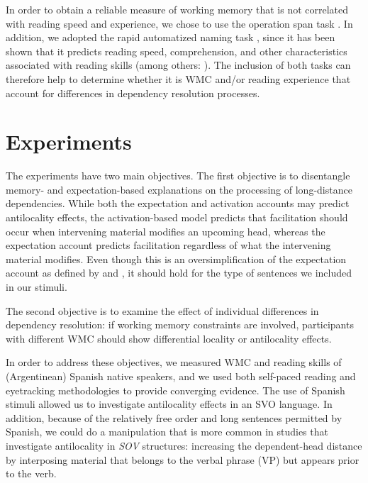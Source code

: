 \documentclass{frontiersSCNS}\usepackage{knitr}
\begin{document}
In order to obtain a reliable measure of working memory that is not correlated with reading speed and experience, we chose to use the operation span task \citep{TurnerEngle1989,ConwayEtAl2005}. In addition, we adopted the rapid automatized naming task  \citep{DenklaRudel1976}, since it has been shown that it predicts reading speed, comprehension, and other characteristics associated with reading skills (among others: \citealp{KupermanVanDyke2011}). The inclusion of both tasks can therefore help to determine whether it is WMC and/or reading experience that account for differences in dependency resolution processes.



 \section{Experiments} 




The experiments have two main objectives. The first objective is to disentangle memory- and expectation-based explanations on the processing of long-distance dependencies. While both the expectation and activation accounts may predict antilocality effects, the activation-based model predicts that facilitation should occur when intervening material modifies an upcoming head, whereas the expectation account predicts facilitation regardless of what the intervening material modifies. Even though this is an oversimplification of the expectation account as defined by \citet{Hale2001} and \cite{Levy2008}, it should hold for the type of sentences we included in our stimuli.



The second objective is to examine the effect of individual differences in dependency resolution:  if working memory constraints are involved, participants with different WMC should show differential locality or antilocality effects. 


In order to address these objectives, we measured WMC and reading skills of (Argentinean) Spanish native speakers, and we used both self-paced reading and eyetracking methodologies to provide converging evidence. The use of Spanish stimuli allowed us to investigate antilocality effects in an SVO language. In addition, because of the relatively free order and long sentences permitted by Spanish, we could do a manipulation that is more common in studies that investigate antilocality in \emph{SOV} structures: increasing the dependent-head distance by interposing material that belongs to the verbal phrase (VP) but appears prior to the verb.
\end{document}
